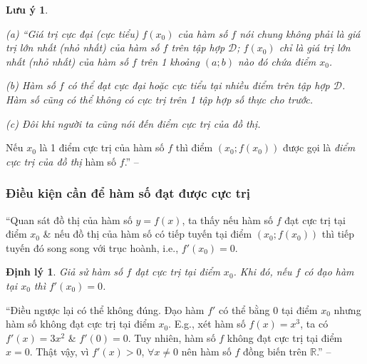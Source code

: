 \documentclass{article}
\numberwithin{equation}{section}
\newtheorem{luuy}{Lưu ý}[section]
\newtheorem{dinhly}{Định lý}[section]
\begin{document}
\begin{luuy}
	\begin{enumerate*}
		\item[(a)] ``Giá trị cực đại (cực tiểu) $f(x_0)$ của hàm số $f$ nói chung không phải là giá trị lớn nhất (nhỏ nhất) của hàm số $f$ trên tập hợp $\mathcal{D}$; $f(x_0)$ chỉ là giá trị lớn nhất (nhỏ nhất) của hàm số $f$ trên 1 khoảng $(a;b)$ nào đó chứa điểm $x_0$.
		\item[(b)] Hàm số $f$ có thể đạt cực đại hoặc cực tiểu tại nhiều điểm trên tập hợp $\mathcal{D}$. Hàm số cũng có thể không có cực trị trên 1 tập hợp số thực cho trước.
		\item[(c)] Đôi khi người ta cũng nói đến điểm cực trị của đồ thị.
	\end{enumerate*}
\end{luuy}
Nếu $x_0$ là 1 điểm cực trị của hàm số $f$ thì điểm $(x_0;f(x_0))$ được gọi là \textit{điểm cực trị của đồ thị} hàm số $f$.'' -- \cite[p. 11]{SGK_Toan_12_giai_tich_nang_cao}

\subsubsection{Điều kiện cần để hàm số đạt được cực trị}
``Quan sát đồ thị của hàm số $y = f(x)$, ta thấy nếu hàm số $f$ đạt cực trị tại điểm $x_0$ \& nếu đồ thị của hàm số có tiếp tuyến tại điểm $(x_0;f(x_0))$ thì tiếp tuyến đó song song với trục hoành, i.e., $f'(x_0) = 0$.

\begin{dinhly}
	Giả sử hàm số $f$ đạt cực trị tại điểm $x_0$. Khi đó, nếu $f$ có đạo hàm tại $x_0$ thì $f'(x_0) = 0$.
\end{dinhly}
``Điều ngược lại có thể không đúng. Đạo hàm $f'$ có thể bằng $0$ tại điểm $x_0$ nhưng hàm số không đạt cực trị tại điểm $x_0$. E.g., xét hàm số $f(x) = x^3$, ta có $f'(x) = 3x^2$ \& $f'(0) = 0$. Tuy nhiên, hàm số $f$ không đạt cực trị tại điểm $x = 0$. Thật vậy, vì $f'(x) > 0$, $\forall x\ne 0$ nên hàm số $f$ đồng biến trên $\mathbb{R}$.'' -- \cite[p. 11]{SGK_Toan_12_giai_tich_nang_cao}
\end{document}

